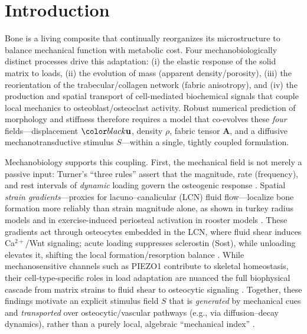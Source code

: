 \section*{Introduction}
\label{s:introduction}
Bone is a living composite that continually reorganizes its microstructure to balance mechanical function with metabolic cost. Four mechanobiologically distinct processes drive this adaptation: (i) the elastic response of the solid matrix to loads, (ii) the evolution of mass (apparent density/porosity), (iii) the reorientation of the trabecular/collagen network (fabric anisotropy), and (iv) the production and spatial transport of cell-mediated biochemical signals that couple local mechanics to osteoblast/osteoclast activity. Robust numerical prediction of morphology and stiffness therefore requires a model that co-evolves these \emph{four} fields---displacement $\rev{\mathbf{u}}$, density $\rho$, fabric tensor $\mathbf{A}$, and a diffusive mechanotransductive stimulus $S$---within a single, tightly coupled formulation.

Mechanobiology supports this coupling. First, the mechanical field is not merely a passive input: Turner’s “three rules” assert that the magnitude, rate (frequency), and rest intervals of \emph{dynamic} loading govern the osteogenic response \cite{Turner1998_ThreeRulesBone}. Spatial \emph{strain gradients}---proxies for lacuno--canalicular (LCN) fluid flow---localize bone formation more reliably than strain magnitude alone, as shown in turkey radius models \cite{Gross1997_StrainGradientsCorrelate} and in exercise-induced periosteal activation in rooster models \cite{Zernicke1997_StrainGradientsCorrelate}. These gradients act through osteocytes embedded in the LCN, where fluid shear induces Ca$^{2+}$/Wnt signaling; acute loading suppresses sclerostin (Sost), while unloading elevates it, shifting the local formation/resorption balance \cite{Robling2008_MechanicalStimulationBone}. While mechanosensitive channels such as PIEZO1 contribute to skeletal homeostasis, their cell-type-specific roles in load adaptation are nuanced   the full biophysical cascade from matrix strains to fluid shear to osteocytic signaling \cite{Wang2020_MechanicalSensingProtein}. Together, these findings motivate an explicit stimulus field $S$ that is \emph{generated} by mechanical cues and \emph{transported} over osteocytic/vascular pathways (e.g., via diffusion--decay dynamics), rather than a purely local, algebraic ``mechanical index'' .


